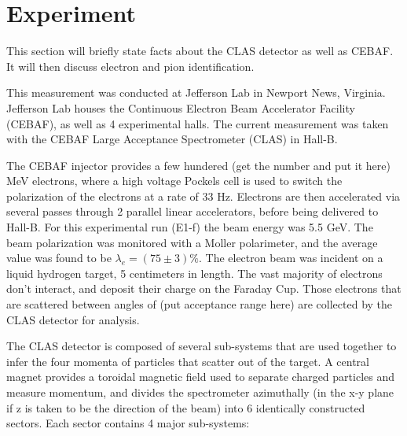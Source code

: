 \section{Experiment}

This section will briefly state facts about the CLAS detector as well as CEBAF.  It will then discuss electron and pion identification.


This measurement was conducted at Jefferson Lab in Newport News, Virginia.  Jefferson Lab houses the Continuous Electron Beam Accelerator Facility (CEBAF), as well as 4 experimental halls.  The current measurement was taken with the CEBAF Large Acceptance Spectrometer (CLAS) in Hall-B.  

The CEBAF injector provides a few hundered (get the number and put it here) MeV electrons, where a high voltage Pockels cell is used to switch the polarization of the electrons at a rate of 33 Hz.  Electrons are then accelerated via several passes through 2 parallel linear accelerators, before being delivered to Hall-B.  For this experimental run (E1-f) the beam energy was 5.5 GeV.  The beam polarization was monitored with a Moller polarimeter, and the average value was found to be $\lambda_e= (75 \pm 3) \%$.  The electron beam was incident on a liquid hydrogen target, 5 centimeters in length.  The vast majority of electrons don't interact, and deposit their charge on the Faraday Cup.  Those electrons that are scattered between angles of (put acceptance range here) are collected by the CLAS detector for analysis.  

The CLAS detector is composed of several sub-systems that are used together to infer the four momenta of particles that scatter out of the target.  A central magnet provides a toroidal magnetic field used to separate charged particles and measure momentum, and divides the spectrometer azimuthally (in the x-y plane if z is taken to be the direction of the beam) into 6 identically constructed sectors.  Each sector contains 4 major sub-systems: 

